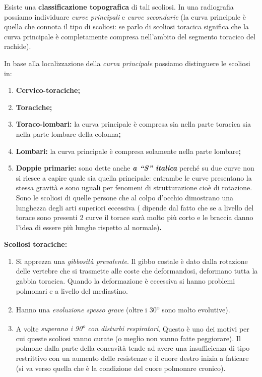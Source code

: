 Esiste una \textbf{classificazione topografica} di tali scoliosi. In una
radiografia possiamo individuare \emph{curve principali} e \emph{curve
secondarie} (la curva principale è quella che connota il tipo di
scoliosi: se parlo di scoliosi toracica significa che la curva
principale è completamente compresa nell'ambito del segmento toracico
del rachide).

In base alla localizzazione della \emph{curva principale} possiamo
distinguere le scoliosi in:

\begin{enumerate}
\def\labelenumi{\arabic{enumi}.}
\item
  \textbf{Cervico-toraciche;}
\item 
  \textbf{Toraciche;}
\item 
  \textbf{Toraco-lombari:} la curva principale è compresa sia nella
  parte toracica sia nella parte lombare della colonna\textbf{;}
\item 
  \textbf{Lombari:} la curva principale è compresa solamente nella parte
  lombare\textbf{;}
\item 
  \textbf{Doppie primarie:} sono dette anche \emph{\textbf{a ``S''
  italica}} perché su due curve non si riesce a capire quale sia quella
  principale: entrambe le curve presentano la stessa gravità e sono
  uguali per fenomeni di strutturazione cioè di rotazione. Sono le
  scoliosi di quelle persone che al colpo d'occhio dimostrano una
  lunghezza degli arti superiori eccessiva ( dipende dal fatto che se a
  livello del torace sono presenti 2 curve il torace sarà molto più
  corto e le braccia danno l'idea di essere più lunghe rispetto al
  normale)\textbf{.}
\end{enumerate}

\textbf{Scoliosi toraciche: }

\begin{enumerate}
\def\labelenumi{\arabic{enumi}.}
\item
  Si apprezza una \emph{gibbosità prevalente}. Il gibbo costale è dato
  dalla rotazione delle vertebre che si trasmette alle coste che
  deformandosi, deformano tutta la gabbia toracica. Quando la
  deformazione è eccessiva si hanno problemi polmonari e a livello del
  mediastino.
\item 
  Hanno una \emph{evoluzione spesso grave} (oltre i 30\textsuperscript{o} sono molto
  evolutive).
\item 
  A volte \emph{superano i 90\textsuperscript{o} con disturbi respiratori}. Questo è uno
  dei motivi per cui queste scoliosi vanno curate (o meglio non vanno
  fatte peggiorare). Il polmone dalla parte della concavità tende ad
  avere una insufficienza di tipo restrittivo con un aumento delle
  resistenze e il cuore destro inizia a faticare (si va verso quella che
  è la condizione del cuore polmonare cronico).
\end{enumerate}

